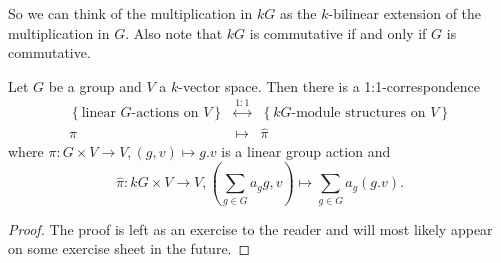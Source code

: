 So we can think of the multiplication in $kG$ as the $k$-bilinear extension of the multiplication in $G$. Also note that $kG$ is commutative if and only if $G$ is commutative.


\begin{lem}
 Let $G$ be a group and $V$ a $k$-vector space. Then there is a 1:1-correspondence
 \[
 \begin{matrix}
    \left\{\text{linear $G$-actions on $V$}\right\}
  & \overset{1:1}{\longleftrightarrow}
  & \left\{\text{$kG$-module structures on $V$}\right\} \\
    \pi
  & \longmapsto
  & \hat{\pi}
  \end{matrix}
 \]
 where $\pi : G \times V \to V, (g,v) \mapsto g.v$ is a linear group action and
 \[
  \hat{\pi} : kG \times V \to V, \left(\sum_{g \in G} a_g g, v\right) \mapsto \sum_{g \in G} a_g (g.v).
 \]
\end{lem}
\begin{proof}
 The proof is left as an exercise to the reader and will most likely appear on some exercise sheet in the future.
\end{proof}




